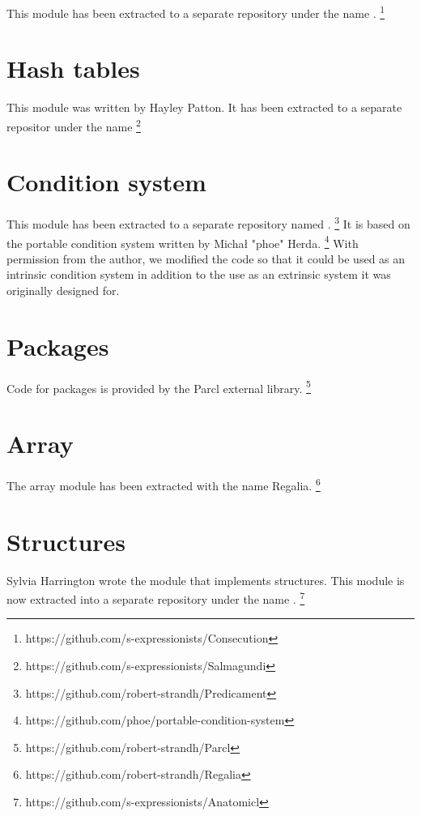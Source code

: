This module has been extracted to a separate repository under the name
\consecution{}.%
\footnote{https://github.com/s-expressionists/Consecution}

\section{Hash tables}
\label{sec-hash-tables}

This module was written by Hayley Patton.  It has been extracted to a
separate repositor under the name \salmagundi{}%
\footnote{https://github.com/s-expressionists/Salmagundi}

\section{Condition system}
\label{sec-condition-system}

This module has been extracted to a separate repository named
\predicament{}.%
\footnote{https://github.com/robert-strandh/Predicament}
It is based on the portable condition system written by Michał "phoe"
Herda.%
\footnote{https://github.com/phoe/portable-condition-system}
With permission from the author, we modified the code so that it could
be used as an intrinsic condition system in addition to the use as an
extrinsic system it was originally designed for.

\section{Packages}
\label{sec-packages}

Code for packages is provided by the Parcl external library.%
\footnote{https://github.com/robert-strandh/Parcl}

\section{Array}
\label{sec-array}

The array module has been extracted with the name Regalia.%
\footnote{https://github.com/robert-strandh/Regalia}

\section{Structures}
\label{sec-structures}

Sylvia Harrington wrote the \sysname{} module that implements
structures.  This module is now extracted into a separate repository
under the name \anatomicl{}.%
\footnote{https://github.com/s-expressionists/Anatomicl}


